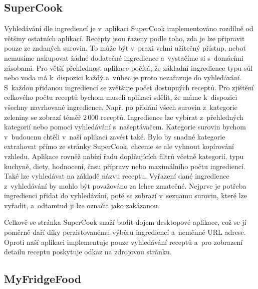 \subsection{SuperCook}

Vyhledávání dle ingrediencí je v~aplikaci SuperCook implementováno rozdílně od většiny ostatních aplikací. Recepty jsou řazeny podle toho, zda je lze připravit pouze ze zadaných surovin. To může být v~praxi velmi užitečný přístup, neboť nemusíme nakupovat žádné dodatečné ingredience a~vystačíme si s~domácími zásobami. Pro větší přehlednost aplikace počítá, že základní ingredience typu sůl nebo voda má k~dispozici každý a~vůbec je proto nezařazuje do vyhledávání. S~každou přidanou ingrediencí se zvětšuje počet dostupných receptů. Pro zjištění celkového počtu receptů bychom museli aplikaci sdělit, že máme k~dispozici všechny navrhované ingredience. Např. po přidání všech surovin z~kategorie zeleniny se zobrazí téměř $2\,000$ receptů. Ingredience lze vybírat z~přehledných kategorií nebo pomocí vyhledávání s~našeptávačem. Kategorie surovin bychom v~budoucnu chtěli v~naší aplikaci zavést také. Bylo by snadné kategorie extrahovat přímo ze stránky SuperCook, chceme se ale vyhnout kopírování vzhledu. Aplikace rovněž nabízí řadu doplňujících filtrů včetně kategorií, typu kuchyně, diety, hodnocení, času přípravy nebo maximálního počtu ingrediencí. Také lze vyhledávat na základě názvu receptu. Vyřazení dané ingredience z~vyhledávání by mohlo být považováno za lehce zmatečné. Nejprve je potřeba ingredienci přidat do vyhledávání, poté se zobrazí v~seznamu surovin, které lze vyřadit, a~odtamtud ji lze označit jako zakázanou.

Celkově se stránka SuperCook snaží budit dojem desktopové aplikace, což se jí poměrně daří díky perzistovanému výběru ingrediencí a~neměnné URL adrese. Oproti naší aplikaci implementuje pouze vyhledávání receptů a~pro zobrazení detailu receptu poskytuje odkaz na zdrojovou stránku. 

\subsection{MyFridgeFood}

